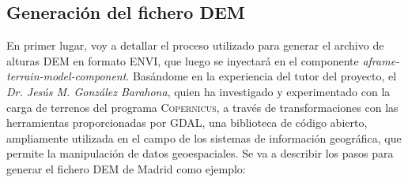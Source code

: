 \documentclass[a4paper, 11pt]{book}
\begin{document}
\subsection{Generación del fichero DEM}
\label{sec:dem}
En primer lugar, voy a detallar el proceso utilizado para generar el archivo de alturas \textsc{DEM} en formato \textsc{ENVI}, que luego se inyectará en el componente \emph{aframe-terrain-model-component}.
Basándome en la experiencia del tutor del proyecto, el \emph{Dr. Jesús M. González Barahona}, quien ha investigado y experimentado con la carga de terrenos del programa \textsc{Copernicus}, a través de transformaciones con las herramientas proporcionadas por \textsc{GDAL}, una biblioteca de código abierto, ampliamente utilizada en el campo de los sistemas de información geográfica, que permite la manipulación de datos geoespaciales.
Se va a describir los pasos para generar el fichero \textsc{DEM} de Madrid como ejemplo:
\label{manual:generacionDem}
\end{document}

